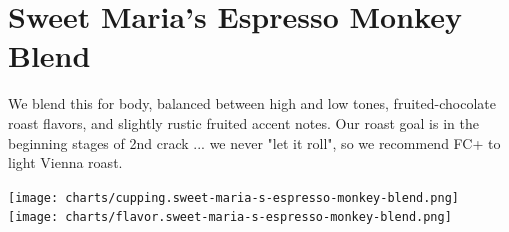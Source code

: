 \documentclass[10pt,twoside,footinclude=true,headinclude=true]{scrbook} %
\begin{document}

\chapter*{Sweet Maria's Espresso Monkey Blend}
 
\begin{addmargin}[2.2em]{2.2em}
\small
\justify
We blend this for body, balanced between high and low tones, fruited-chocolate roast flavors, and slightly rustic fruited accent notes. Our roast goal is in the beginning stages of 2nd crack ... we never "let it roll", so we recommend FC+ to light Vienna roast.
\end{addmargin}

\centering
\vspace{2mm}
\texttt{[image: charts/cupping.sweet-maria-s-espresso-monkey-blend.png]}
\texttt{[image: charts/flavor.sweet-maria-s-espresso-monkey-blend.png]}
\end{document}
